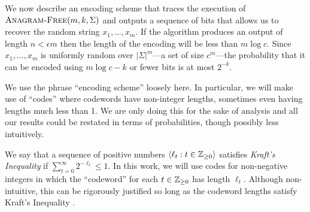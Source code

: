 \documentclass{patmorin}
\begin{document}
We now describe an encoding scheme that traces the execution of $\textsc{Anagram-Free}(m, k, \Sigma)$ and outputs a sequence of bits that allows us to recover the random string $x_1,\ldots,x_m$.  If the algorithm produces an output of length $n < \epsilon m$ then the length of the encoding will be less than $m\log c$.  Since $x_1,\ldots,x_m$ is uniformly random over $|\Sigma|^m$---a set of size $c^m$---the probability that it can be encoded using $m\log c - k$ or fewer bits is at most $2^{-k}$.

We use the phrase ``encoding scheme'' loosely here.  In particular, we will make use of ``codes'' where codewords have non-integer lengths, sometimes even having lengths much less than 1.  We are only doing this for the sake of analysis and all our results could be restated in terms of probabilities, though possibly less intuitively.

We say that a sequence of positive numbers $\langle \ell_t : t\in\mathbb{Z}_{\ge 0}\rangle$ satisfies \emph{Kraft's Inequality} if $\sum_{t=0}^{\infty} 2^{-\ell_t} \le 1$.  In this work, we will use codes for non-negative integers in which the ``codeword'' for each $t\in\mathbb{Z}_{\ge 0}$ has length $\ell_t$. Although non-intuitive, this can be rigorously justified so long as the codeword lengths satisfy Kraft's Inequality \cite[Section~7]{morin.mulzer.ea:encoding}.

% 
\end{document}
